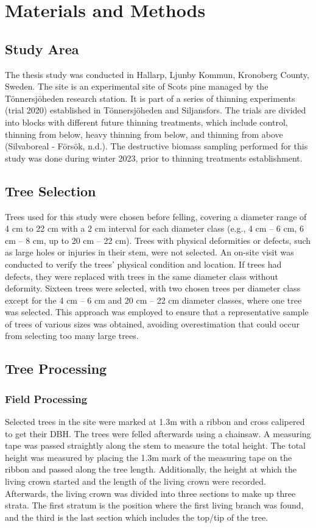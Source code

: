 \documentclass[11pt, a4paper]{report}
\begin{document}
\chapter{Materials and Methods}
\section{Study Area}
The thesis study was conducted in Hallarp, Ljunby Kommun, Kronoberg County, Sweden. The site is an experimental site of Scots pine managed by the Tönnersjöheden research station. It is part of a series of thinning experiments (trial 2020) established in Tönnersjöheden and Siljansfors. The trials are divided into blocks with different future thinning treatments, which include control, thinning from below, heavy thinning from below, and thinning from above (Silvaboreal - Försök, n.d.). The destructive biomass sampling performed for this study was done during winter 2023, prior to thinning treatments establishment.
\section{Tree Selection}
Trees used for this study were chosen before felling, covering a diameter range of 4 cm to 22 cm with a 2 cm interval for each diameter class (e.g., 4 cm – 6 cm, 6 cm – 8 cm, up to 20 cm – 22 cm). Trees with physical deformities or defects, such as large holes or injuries in their stem, were not selected. An on-site visit was conducted to verify the trees’ physical condition and location. If trees had defects, they were replaced with trees in the same diameter class without deformity. Sixteen trees were selected, with two chosen trees per diameter class except for the 4 cm – 6 cm and 20 cm – 22 cm diameter classes, where one tree was selected. This approach was employed to ensure that a representative sample of trees of various sizes was obtained, avoiding overestimation that could occur from selecting too many large trees.
\section{Tree Processing}
\subsection{Field Processing}
Selected trees in the site were marked at 1.3m with a ribbon and cross calipered to get their DBH. The trees were felled afterwards using a chainsaw. A measuring tape was passed straightly along the stem to measure the total height. The total height was measured by placing the 1.3m mark of the measuring tape on the ribbon and passed along the tree length. Additionally, the height at which the living crown started and the length of the living crown were recorded. Afterwards, the living crown was divided into three sections to make up three strata. The first stratum is the position where the first living branch was found, and the third is the last section which includes the top/tip of the tree.
\end{document}
